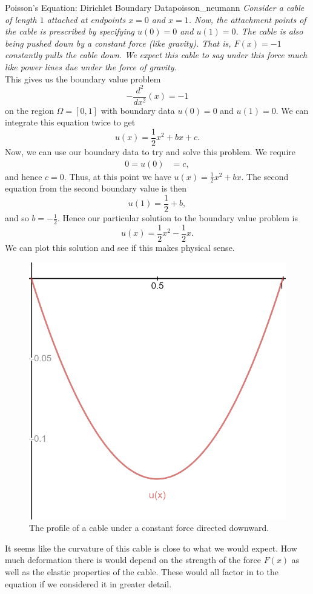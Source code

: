 \begin{ex}{Poisson's Equation: Dirichlet Boundary Data}{poisson_neumann}
\emph{Consider a cable of length $1$ attached at endpoints $x=0$ and $x=1$.  Now, the attachment points of the cable is prescribed by specifying $u(0)=0$ and $u(1)=0$. The cable is also being pushed down by a constant force (like gravity). That is, $F(x)=-1$ constantly pulls the cable down.  We expect this cable to sag under this force much like power lines due under the force of gravity.}\\

This gives us the boundary value problem
\[
-\frac{d^2}{dx^2}(x)=-1
\]
on the region $\Omega = [0,1]$ with boundary data $u(0)=0$ and $u(1)=0$. We can integrate this equation twice to get
\[
u(x)= \frac{1}{2}x^2+bx+c.
\]
Now, we can use our boundary data to try and solve this problem. We require
\begin{align*}
    0=u(0)&=c,
\end{align*}
and hence $c=0$.  Thus, at this point we have $u(x)=\frac{1}{2}x^2+bx$.  The second equation from the second boundary value is then
\[
u(1)=\frac{1}{2}+b,
\]
and so $b=-\frac{1}{2}$. Hence our particular solution to the boundary value problem is
\[
\boxed{u(x)=\frac{1}{2}x^2-\frac{1}{2}x.}
\]
We can plot this solution and see if this makes physical sense.
\begin{figure}[H]
    \centering 
    \includegraphics[width=.6\textwidth]{Figures_Part_1/poisson_equation_gravity.png}
    \caption{The profile of a cable under a constant force directed downward.}
\end{figure}

It seems like the curvature of this cable is close to what we would expect.  How much deformation there is would depend on the strength of the force $F(x)$ as well as the elastic properties of the cable.  These would all factor in to the equation if we considered it in greater detail.
\end{ex}

